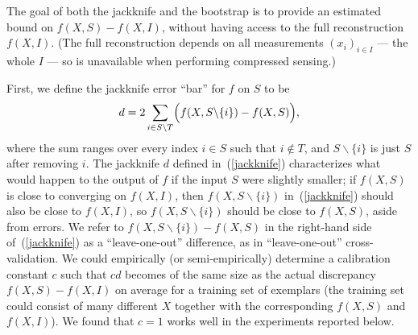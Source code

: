 \documentclass[article]{jdssv}
\begin{document}
The goal of both the jackknife and the bootstrap is to provide an estimated
bound on $f(X, S) - f(X, I)$, without having access to the full reconstruction
$f(X, I)$. (The full reconstruction depends on all measurements
$(x_i)_{i \in I}$ --- the whole $I$ --- so is unavailable when performing
compressed sensing.)

First, we define the jackknife error ``bar'' for $f$ on $S$ to be
%
\begin{equation}
\label{jackknife}
d = 2 \sum_{i \in S \backslash T}
    \Bigl( f(X, S \backslash \{i\}) - f(X, S) \Bigr),
\end{equation}
%
where the sum ranges over every index $i \in S$ such that $i \notin T$,
and $S \backslash \{i\}$ is just $S$ after removing $i$.
The jackknife $d$ defined in~(\ref{jackknife}) characterizes
what would happen to the output of $f$ if the input $S$ were slightly smaller;
if $f(X, S)$ is close to converging on $f(X, I)$,
then $f(X, S \backslash \{i\})$ in~(\ref{jackknife}) should also be close
to $f(X, I)$, so $f(X, S \backslash \{i\})$ should be close to $f(X, S)$,
aside from errors.
We refer to $f(X, S \backslash \{i\}) - f(X, S)$ in the right-hand side
of~(\ref{jackknife}) as a ``leave-one-out'' difference,
as in ``leave-one-out'' cross-validation.
We could empirically (or semi-empirically) determine a calibration constant $c$
such that $cd$ becomes of the same size as the actual discrepancy
$f(X, S) - f(X, I)$ on average for a training set of exemplars
(the training set could consist of many different $X$ together
with the corresponding $f(X, S)$ and $f(X,I)$).
We found that $c = 1$ works well in the experiments reported below.
\end{document}
